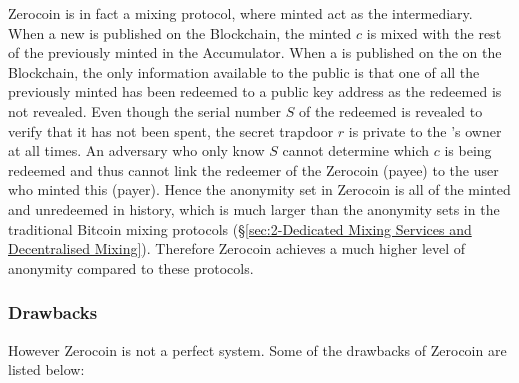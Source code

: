 Zerocoin is in fact a mixing protocol, where minted  act as the intermediary. When a new  is published on the Blockchain, the minted \kwCoin{} $c$ is mixed with the rest of the previously minted  in the Accumulator. When a  is published on the on the Blockchain, the only information available to the public is that one of all the previously minted  has been redeemed to a public key address as the redeemed \kwCoin{} is not revealed. Even though the serial number $S$ of the redeemed \kwCoin{} is revealed to verify that it has not been spent, the secret trapdoor $r$ is private to the \kwCoin{}’s owner at all times. An adversary who only know $S$ cannot determine which $c$ is being redeemed and thus cannot link the redeemer of the Zerocoin (payee) to the user who minted this \kwCoin{} (payer). Hence the anonymity set in Zerocoin is all of the minted and unredeemed  in history, which is much larger than the anonymity sets in the traditional Bitcoin mixing protocols (\S\ref{sec:2-Dedicated Mixing Services and Decentralised Mixing}). Therefore Zerocoin achieves a much higher level of anonymity compared to these protocols.

\subsubsection{Drawbacks}
\label{sec:2-Zerocoin Drawbacks}
However Zerocoin is not a perfect system. Some of the drawbacks of Zerocoin are listed below:

